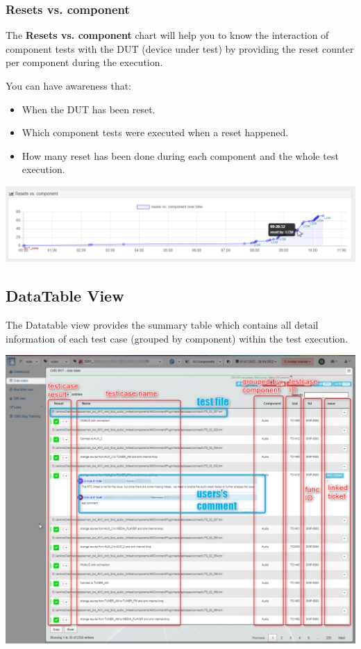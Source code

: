 \subsubsection{Resets vs. component}

The \textbf{Resets vs. component} chart will help you to know the interaction
of component tests with the DUT (device under test) by providing the reset counter
per component during the execution. 

You can have awareness that:
\begin{itemize}
   \item When the DUT has been reset.
   \item Which component tests were executed when a reset happened.
   \item How many reset has been done during each component and the whole
         test execution.
\end{itemize}

\includegraphics[width=1\linewidth]
{./pictures/dashboard/reset_vs_component.png}

\hypertarget{datatable-view}{%
\subsection{DataTable View}\label{datatable-view}}

The Datatable view provides the summary table which contains all detail information 
of each test case (grouped by component) within the test execution.

\includegraphics[width=1\linewidth]{./pictures/view_datatable.png}

